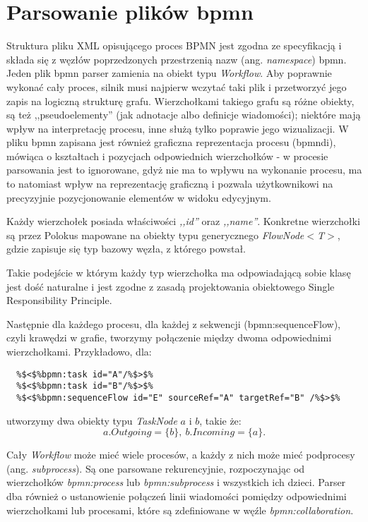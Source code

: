\documentclass[declaration,shortabstract,mgr]{iithesis}
\newcommand{\bpmn}{BPMN }
\begin{document}
\section{Parsowanie plików bpmn}
Struktura pliku XML opisującego proces \bpmn jest zgodna
ze specyfikacją i składa się z węzłów poprzedzonych przestrzenią nazw (ang. \textit{namespace}) bpmn. Jeden plik bpmn parser zamienia na obiekt typu \textit{Workflow}.  Aby poprawnie wykonać cały proces, silnik musi najpierw wczytać taki plik i przetworzyć jego zapis na logiczną strukturę grafu. Wierzchołkami takiego grafu są różne obiekty, są też ,,pseudoelementy'' (jak adnotacje albo definicje wiadomości); niektóre mają wpływ na interpretację procesu, inne służą tylko poprawie jego wizualizacji. W pliku bpmn zapisana jest również graficzna reprezentacja procesu (bpmndi), mówiąca o kształtach i pozycjach odpowiednich wierzchołków - w procesie parsowania jest to ignorowane, gdyż nie ma to wpływu na wykonanie procesu, ma to 
natomiast wpływ na reprezentację graficzną i pozwala użytkownikowi
na precyzyjnie pozycjonowanie elementów w widoku edycyjnym.

Każdy wierzchołek posiada właściwości \textit{,,id''} oraz \textit{,,name''}. Konkretne wierzchołki są przez Polokus mapowane na obiekty typu generycznego \emph{FlowNode$<$T$>$}, gdzie zapisuje się typ bazowy węzła, z którego powstał. 

Takie podejście w którym każdy typ wierzchołka ma odpowiadającą sobie
klasę jest dość naturalne i jest zgodne z zasadą projektowania obiektowego Single Responsibility Principle. 

Następnie dla każdego procesu, dla każdej z sekwencji (bpmn:sequenceFlow), czyli krawędzi w grafie, tworzymy połączenie między dwoma odpowiednimi wierzchołkami. Przykładowo, dla:

\begin{minipage}[c]{\textwidth}
\centering
\begin{lstlisting}
  %$<$%bpmn:task id="A"/%$>$%
  %$<$%bpmn:task id="B"/%$>$%
  %$<$%bpmn:sequenceFlow id="E" sourceRef="A" targetRef="B" /%$>$%
\end{lstlisting}
\end{minipage}

\noindent utworzymy dwa obiekty typu \textit{TaskNode} $a$ i $b$, takie że: $$a.Outgoing = \{b\},\ b.Incoming = \{a\}.$$

Cały \textit{Workflow} może mieć wiele procesów, a każdy z nich może mieć podprocesy (ang. \textit{subprocess}). Są one parsowane rekurencyjnie, rozpoczynając od wierzchołków \textit{bpmn:process} lub \textit{bpmn:subprocess} i wszystkich ich dzieci. Parser dba również o ustanowienie połączeń linii wiadomości pomiędzy odpowiednimi wierzchołkami lub procesami, które są zdefiniowane w węźle \textit{bpmn:collaboration}.
\end{document}

